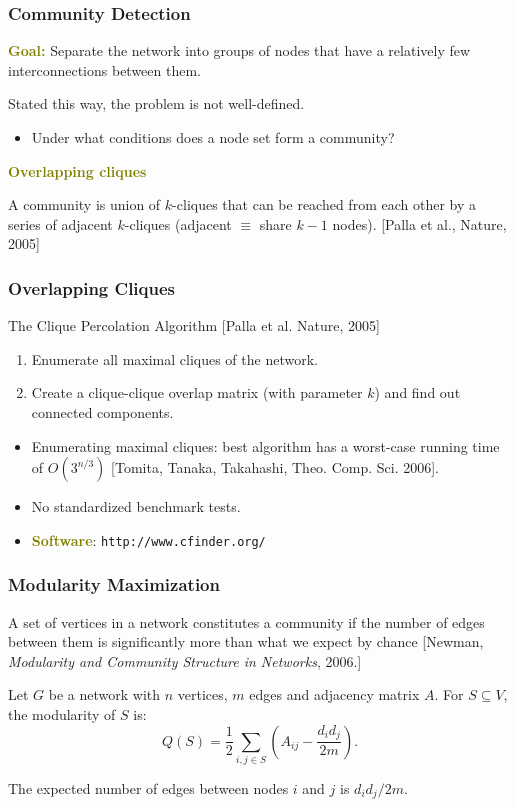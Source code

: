 \documentclass[xcolor=table]{beamer}
\begin{document}
\begin{frame}[t]
\frametitle{Community Detection}
\textcolor{olive}{\textbf{Goal:}} Separate the network into groups of nodes that have 
a relatively few interconnections between them. 

\medskip

Stated this way, the problem is not well-defined. 
\begin{itemize}
	\item Under what conditions does a node set form a community? 
\end{itemize}

\medskip

\textcolor{olive}{\textbf{Overlapping cliques}}

\smallskip

A community is union of $k$-cliques that can be reached from 
each other by a series of adjacent $k$-cliques (adjacent $\equiv$ share $k-1$ nodes).
[Palla et al., Nature, 2005]
\end{frame}

\begin{frame}[t]
\frametitle{Overlapping Cliques}
The Clique Percolation Algorithm [Palla et al. Nature, 2005]
\begin{enumerate}
	\item Enumerate all maximal cliques of the network.
	\item Create a clique-clique overlap matrix (with parameter $k$) 
		and find out connected components.
\end{enumerate}


\begin{itemize}
	\item Enumerating maximal cliques: best algorithm has a worst-case 
	running time of $O(3^{n/3})$  [Tomita, Tanaka, Takahashi, Theo. Comp. Sci. 2006].
	
	\item No standardized benchmark tests.

	\item \textcolor{olive}{\textbf{Software}}: \texttt{http://www.cfinder.org/}
\end{itemize}
\end{frame}

\begin{frame}[t]
\frametitle{Modularity Maximization}
A set of vertices in a network constitutes a community if the number 
of edges between them is significantly more than what we expect by chance
[Newman, \emph{Modularity and Community Structure in Networks}, 2006.]

\begin{definition}
	Let $G$ be a network with $n$ vertices, $m$ edges and adjacency matrix $A$.
	For $S \subseteq V$, the modularity of $S$ is:
	\[
		Q(S) = \frac{1}{2} \sum_{i, j \in S} \left ( A_{i j} - \frac{d_i d_j}{2m} \right ). 
	\]
\end{definition} 
The expected number of edges between nodes $i$ and $j$ is $d_i d_j / 2m$.
\end{frame}
\end{document}
